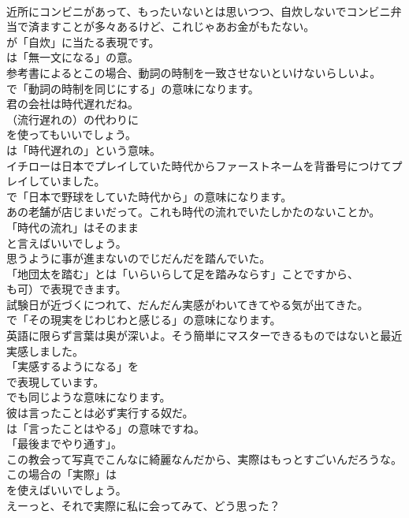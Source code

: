 \documentclass[8pt]{extreport}
\begin{document}
\begin{CJK}{UTF8}{min}
\\	近所にコンビニがあって、もったいないとは思いつつ、自炊しないでコンビニ弁当で済ますことが多々あるけど、これじゃあお金がもたない。 
\\	が「自炊」に当たる表現です。
\\	は「無一文になる」の意。	
\\	参考書によるとこの場合、動詞の時制を一致させないといけないらしいよ。 
\\	で「動詞の時制を同じにする」の意味になります。	
\\	君の会社は時代遅れだね。 
\\	（流行遅れの）の代わりに
\\	を使ってもいいでしょう。
\\	は「時代遅れの」という意味。	
\\	イチローは日本でプレイしていた時代からファーストネームを背番号につけてプレイしていました。 
\\	で「日本で野球をしていた時代から」の意味になります。	
\\	あの老舗が店じまいだって。これも時代の流れでいたしかたのないことか。 
\\	「時代の流れ」はそのまま
\\	と言えばいいでしょう。	
\\	思うように事が進まないのでじだんだを踏んでいた。 
\\	「地団太を踏む」とは「いらいらして足を踏みならす」ことですから、
\\	も可）で表現できます。	
\\	試験日が近づくにつれて、だんだん実感がわいてきてやる気が出てきた。 
\\	で「その現実をじわじわと感じる」の意味になります。	
\\	英語に限らず言葉は奥が深いよ。そう簡単にマスターできるものではないと最近実感しました。 
\\	「実感するようになる」を 
\\	で表現しています。
\\	でも同じような意味になります。	
\\	彼は言ったことは必ず実行する奴だ。 
\\	は「言ったことはやる」の意味ですね。
\\	「最後までやり通す」。	
\\	この教会って写真でこんなに綺麗なんだから、実際はもっとすごいんだろうな。 
\\	この場合の「実際」は
\\	を使えばいいでしょう。	
\\	えーっと、それで実際に私に会ってみて、どう思った？ 

\end{CJK}
\end{document}
